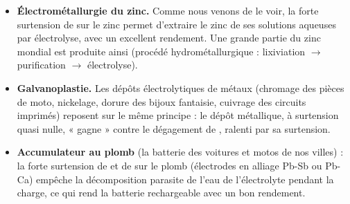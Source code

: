 \documentclass[11pt]{article}
\begin{document}
\begin{itemize}
\item \textbf{Électrométallurgie du zinc.} Comme nous venons de le voir, la forte surtension de  sur le zinc permet d'extraire le zinc de ses solutions aqueuses par électrolyse, avec un excellent rendement. Une grande partie du zinc mondial est produite ainsi (procédé hydrométallurgique : lixiviation $\rightarrow$ purification $\rightarrow$ électrolyse).
\item \textbf{Galvanoplastie.} Les dépôts électrolytiques de métaux (chromage des pièces de moto, nickelage, dorure des bijoux fantaisie, cuivrage des circuits imprimés) reposent sur le même principe : le dépôt métallique, à surtension quasi nulle, « gagne » contre le dégagement de , ralenti par sa surtension.
\item \textbf{Accumulateur au plomb} (la batterie des voitures et motos de nos villes) : la forte surtension de  et de  sur le plomb (électrodes en alliage Pb-Sb ou Pb-Ca) empêche la décomposition parasite de l'eau de l'électrolyte pendant la charge, ce qui rend la batterie rechargeable avec un bon rendement.
\end{itemize}
\end{document}
